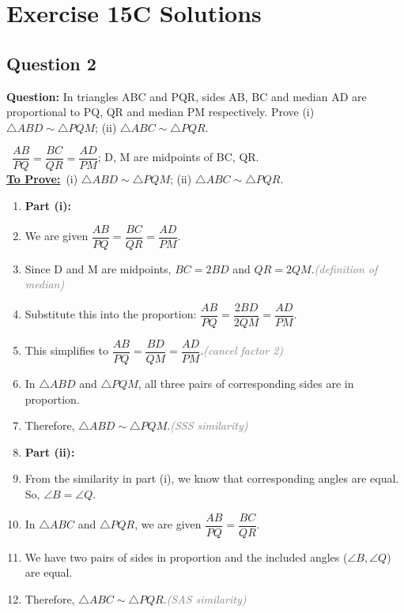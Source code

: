 \documentclass{article}
\newenvironment{steps}{%
  \begin{enumerate}[label=\textcolor{primary}{Step~\arabic*:}, leftmargin=*]
}{\end{enumerate}}
\newcommand{\sul}[1]{\uline{#1}}
\newcommand{\dul}[1]{\uuline{#1}}
\newcommand{\solutionheading}{{\raggedright\dul{\textbf{Solution}}\par}}
\newcommand{\given}[1]{\noindent\textbf{\textcolor{secondary}{\dul{Given:}}}~#1\\}
\newcommand{\toprove}[1]{\noindent\textbf{\textcolor{primary}{\sul{To Prove:}}}~#1\\}
\newcommand{\reason}[1]{\hfill\textit{\textcolor{gray}{(#1)}}}
\begin{document}
\section*{Exercise 15C Solutions}

\subsection*{Question 2}
\textbf{Question:} In triangles ABC and PQR, sides AB, BC and median AD are proportional to PQ, QR and median PM respectively. Prove (i) $\triangle ABD \sim \triangle PQM$; (ii) $\triangle ABC \sim \triangle PQR$.

\solutionheading
\given{$\dfrac{AB}{PQ}=\dfrac{BC}{QR}=\dfrac{AD}{PM}$; D, M are midpoints of BC, QR.}
\toprove{(i) $\triangle ABD\sim\triangle PQM$; (ii) $\triangle ABC\sim\triangle PQR$.}

\begin{center}
\end{center}

\begin{steps}
  \item \textbf{Part (i):}
  \item We are given $\dfrac{AB}{PQ}=\dfrac{BC}{QR}=\dfrac{AD}{PM}$.
  \item Since D and M are midpoints, $BC=2BD$ and $QR=2QM$.\reason{definition of median}
  \item Substitute this into the proportion: $\dfrac{AB}{PQ}=\dfrac{2BD}{2QM}=\dfrac{AD}{PM}$.
  \item This simplifies to $\dfrac{AB}{PQ}=\dfrac{BD}{QM}=\dfrac{AD}{PM}$.\reason{cancel factor 2}
  \item In $\triangle ABD$ and $\triangle PQM$, all three pairs of corresponding sides are in proportion.
  \item Therefore, $\triangle ABD\sim\triangle PQM$.\reason{SSS similarity}
  \item \textbf{Part (ii):}
  \item From the similarity in part (i), we know that corresponding angles are equal. So, $\angle B = \angle Q$.
  \item In $\triangle ABC$ and $\triangle PQR$, we are given $\dfrac{AB}{PQ}=\dfrac{BC}{QR}$.
  \item We have two pairs of sides in proportion and the included angles ($\angle B, \angle Q$) are equal.
  \item Therefore, $\triangle ABC\sim\triangle PQR$.\reason{SAS similarity}
\end{steps}
\end{document}
